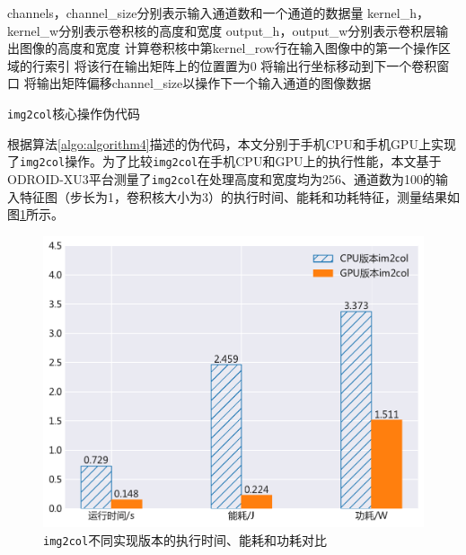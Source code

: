 \begin{algorithm}[htbp]
	\small
	\SetAlgoLined
    \begin{spacing}{0.8}
    channels，channel\_size分别表示输入通道数和一个通道的数据量\;
    kernel\_h，kernel\_w分别表示卷积核的高度和宽度\;
	output\_h，output\_w分别表示卷积层输出图像的高度和宽度\;
     {
         {
             {
                计算卷积核中第kernel\_row行在输入图像中的第一个操作区域的行索引\;
                 {
                     {
                         {
                            将该行在输出矩阵上的位置置为0\;
                        }
                    } 
                    将输出行坐标移动到下一个卷积窗口\;
                }
            }
        }
        将输出矩阵偏移channel\_size以操作下一个输入通道的图像数据\;
    }
    \end{spacing}
	\caption{\texttt{img2col}核心操作伪代码}
	\label{algo:algorithm4}
\end{algorithm}

根据算法\ref{algo:algorithm4}描述的伪代码，本文分别于手机CPU和手机GPU上实现了\texttt{img2col}操作。为了比较\texttt{img2col}在手机CPU和GPU上的执行性能，本文基于ODROID-XU3平台测量了\texttt{img2col}在处理高度和宽度均为256、通道数为100的输入特征图（步长为1，卷积核大小为3）的执行时间、能耗和功耗特征，测量结果如图\ref{figure:figure11}所示。

\begin{figure}[htbp]
    \begin{center}
    \includegraphics[height=0.4\textwidth]{figures/im2col_energy.pdf}
    \end{center}
    \caption{\texttt{img2col}不同实现版本的执行时间、能耗和功耗对比}\label{figure:figure11}
\end{figure}

